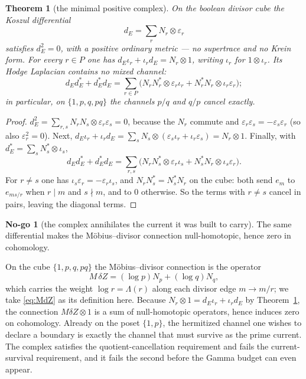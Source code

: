 \documentclass[11pt]{amsart}
\newtheorem{theorem}{Theorem}[section]
\theoremstyle{definition}
\theoremstyle{remark}
\theoremstyle{definition}
\newtheorem{nogo}{No-go}[section]
\newcommand{\eps}{\varepsilon}
\begin{document}
\begin{theorem}[the minimal positive complex]\label{thm:koszul}
On the boolean divisor cube the Koszul differential
\begin{equation}\label{eq:koszul}
   d_E=\sum_rN_r\otimes\eps_r
\end{equation}
satisfies $d_E^2=0$, with a positive ordinary metric --- no supertrace and no Krein form. For
every $r\in P$ one has $d_E\iota_r+\iota_rd_E=N_r\otimes1$, writing $\iota_r$ for
$1\otimes\iota_r$. Its Hodge Laplacian contains no mixed channel:
\[
   d_Ed_E^*+d_E^*d_E=\sum_{r\in P}\bigl(N_rN_r^*\otimes\eps_r\iota_r
   +N_r^*N_r\otimes\iota_r\eps_r\bigr);
\]
in particular, on $\{1,p,q,pq\}$ the channels $p/q$ and $q/p$ cancel exactly.
\end{theorem}

\begin{proof}
$d_E^2=\sum_{r,s}N_rN_s\otimes\eps_r\eps_s=0$, because the $N_r$ commute and
$\eps_r\eps_s=-\eps_s\eps_r$ (so also $\eps_r^2=0$). Next,
$d_E\iota_r+\iota_rd_E=\sum_sN_s\otimes(\eps_s\iota_r+\iota_r\eps_s)=N_r\otimes1$. Finally, with
$d_E^*=\sum_sN_s^*\otimes\iota_s$,
\[
   d_Ed_E^*+d_E^*d_E=\sum_{r,s}\bigl(N_rN_s^*\otimes\eps_r\iota_s+N_s^*N_r\otimes\iota_s\eps_r\bigr).
\]
For $r\ne s$ one has $\iota_s\eps_r=-\eps_r\iota_s$, and $N_rN_s^*=N_s^*N_r$ on the cube: both send
$e_m$ to $e_{ms/r}$ when $r\mid m$ and $s\nmid m$, and to $0$ otherwise. So the terms with $r\ne s$
cancel in pairs, leaving the diagonal terms.
\end{proof}

\begin{nogo}[the complex annihilates the current it was built to carry]\label{ng:koszul}
The same differential makes the M\"obius--divisor connection null-homotopic, hence zero in
cohomology.
\end{nogo}

\noindent On the cube $\{1,p,q,pq\}$ the M\"obius--divisor connection is the operator
\begin{equation}\label{eq:MdZ}
   M\,\delta Z=(\log p)N_p+(\log q)N_q ,
\end{equation}
which carries the weight $\log r=\Lambda(r)$ along each divisor edge $m\to m/r$; we take
\eqref{eq:MdZ} as its definition here. Because $N_r\otimes1=d_E\iota_r+\iota_rd_E$ by
Theorem~\ref{thm:koszul}, the connection $M\delta Z\otimes1$ is a sum of null-homotopic operators, hence induces zero on
cohomology. Already on the poset $\{1,p\}$, the hermitized channel one wishes to declare a
boundary is exactly the channel that must survive as the prime current. The complex satisfies the
quotient-cancellation requirement and fails the current-survival requirement, and it fails the
second before the Gamma budget can even appear.
\end{document}
